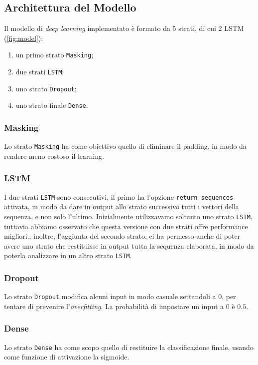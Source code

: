 \documentclass[8pt,notitlepage]{report}
\begin{document}
		\subsection{Architettura del Modello}
			Il modello di \textit{deep learning} implementato è formato da 5 strati, di cui 2 LSTM (\cref{fig:model}):
			\begin{enumerate}
				\item un primo strato \verb|Masking|;
				\item due strati \verb|LSTM|;
				\item uno strato \verb|Dropout|;
				\item uno strato finale \verb|Dense|.
			\end{enumerate}
			
				\subsubsection{Masking}
					Lo strato \verb|Masking| ha come obiettivo quello di eliminare il padding, in modo da rendere meno costoso il learning.
					
				\subsubsection{LSTM}
					I due strati \verb|LSTM| sono consecutivi, il primo ha l'opzione \verb|return_sequences| attivata, in modo da dare in output allo strato successivo tutti i vettori della sequenza, e non solo l'ultimo. Inizialmente utilizzavamo soltanto uno strato \verb|LSTM|, tuttavia abbiamo osservato che questa versione con due strati offre performance migliori.; inoltre, l'aggiunta del secondo strato, ci ha permesso anche di poter avere uno strato che restituisse in output tutta la sequenza elaborata, in modo da poterla analizzare in un altro strato \verb|LSTM|.
					
				\subsubsection{Dropout}
					Lo strato \verb|Dropout| modifica alcuni input in modo casuale settandoli a $ 0 $, per tentare di prevenire l'\textit{overfitting}. La probabilità di impostare un input a $ 0 $ è $ 0.5 $.
					
				\subsubsection{Dense}
					Lo strato \verb|Dense| ha come scopo quello di restituire la classificazione finale, usando come funzione di attivazione la sigmoide. 
			
\end{document}
